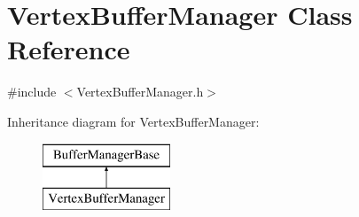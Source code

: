\hypertarget{class_vertex_buffer_manager}{}\section{Vertex\+Buffer\+Manager Class Reference}
\label{class_vertex_buffer_manager}


{\ttfamily \#include $<$Vertex\+Buffer\+Manager.\+h$>$}

Inheritance diagram for Vertex\+Buffer\+Manager\+:\begin{figure}[H]
\begin{center}
\leavevmode
\includegraphics[height=2.000000cm]{d6/dc3/class_vertex_buffer_manager}
\end{center}
\end{figure}
